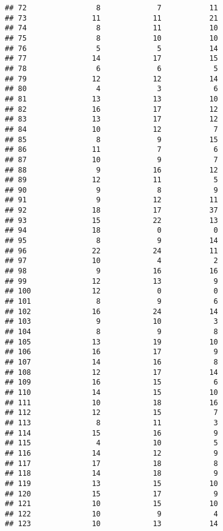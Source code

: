 \documentclass[
]{article}
\begin{document}
\begin{verbatim}
## 72                8             7           11
## 73               11            11           21
## 74                8            11           10
## 75                8            10           10
## 76                5             5           14
## 77               14            17           15
## 78                6             6            5
## 79               12            12           14
## 80                4             3            6
## 81               13            13           10
## 82               16            17           12
## 83               13            17           12
## 84               10            12            7
## 85                8             9           15
## 86               11             7            6
## 87               10             9            7
## 88                9            16           12
## 89               12            11            5
## 90                9             8            9
## 91                9            12           11
## 92               18            17           37
## 93               15            22           13
## 94               18             0            0
## 95                8             9           14
## 96               22            24           11
## 97               10             4            2
## 98                9            16           16
## 99               12            13            9
## 100              12             0            0
## 101               8             9            6
## 102              16            24           14
## 103               9            10            3
## 104               8             9            8
## 105              13            19           10
## 106              16            17            9
## 107              14            16            8
## 108              12            17           14
## 109              16            15            6
## 110              14            15           10
## 111              10            18           16
## 112              12            15            7
## 113               8            11            3
## 114              15            16            9
## 115               4            10            5
## 116              14            12            9
## 117              17            18            8
## 118              14            18            9
## 119              13            15           10
## 120              15            17            9
## 121              10            15           10
## 122              10             9            4
## 123              10            13           14

\end{verbatim}
\end{document}

